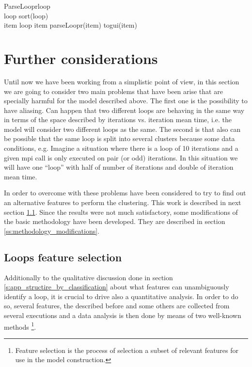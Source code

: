 \begin{pseudocode}{ParseLoopr}{loop}
\label{pc:parse_loop_func}
     \\
    loop \GETS sort(loop) \\

    \FORALL item \in loop \DO
    \BEGIN
        \IF item \in \Upsilon \THEN
            parseLoopr(item)
        \ELSE
            togui(item)
    \END
\end{pseudocode}

\section{Further considerations}\label{s:further_considerations}

Until now we have been working from a simplistic point of view, in this section
we are going to consider two main problems that have been arise that
are specially harmful for the model described above. The first one is the possibility 
to have aliasing. Can happen 
that two different loops are behaving in the same way in terms of the space
described by iterations vs. iteration mean time, i.e. the model will consider 
two different loops as the same. The second
is that also can be possible that the same loop is split into several clusters
because some data conditions, e.g. Imagine a situation where there is a loop of
10 iterations and a given mpi call is only executed on pair (or odd) iterations.
In this situation we will have one ``loop'' with half of number of iterations
and double of iteration mean time. 

In order to overcome with these problems have been considered to try to find out
an alternative features to perform the clustering. This work is described in
next section \ref{ss:loops_characterzation}. Since the results were not much
satisfactory, some modifications of the basic methodology have been developed.
They are described in section \ref{ss:methodology_modifications}.

\subsection{Loops feature selection}\label{ss:loops_characterzation}

Additionally to the qualitative discussion done in section
\ref{s:app_structire_by_classification} about what features can unambiguously
identify a loop, it is crucial to drive also a 
quantitative analysis. In order to do so, several features, the described 
before and some others are collected from several executions and a data analysis
is then done by means of two well-known methods \footnote{Feature selection is
the process of selection a subset of relevant features for use in the model
construction.}. 

